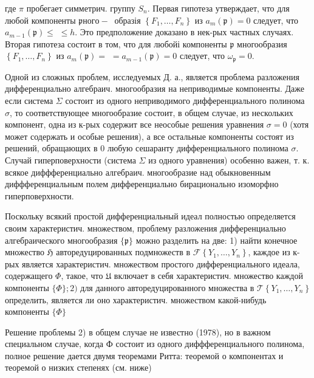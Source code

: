 \documentclass[10pt]{article}
\begin{document}
где $\pi$ пробегает симметрич. группу $S_{n}$. Первая гипотеза утверждает, что для любой компоненты $\mathfrak{p н о г о - ~}$ образія $\left\{F_{1}, \ldots, F_{n}\right\}$ из $a_{m}(\mathfrak{p})=0$ следует, что $a_{m-1}(\mathfrak{p}) \leqslant$ $\leqslant h$. Это предположение доказано в нек-рых частных случаях. Вторая гипотеза состоит в том, что для любойі компоненты $\mathfrak{p}$ многообразия $\left\{F_{1}, \ldots, F_{n}\right\}$ из $a_{m}(\mathfrak{p})=$ $=a_{m-1}(\mathfrak{p})=0$ следует, что $\omega_{\mathfrak{p}}=0$.



Одной из сложных проблем, исследуемых Д. а., является проблема разложения дифференциально алгебраич. многообразия на неприводимые компоненты. Даже если система $\Sigma$ состоит из одного неприводимого дифференциального полинома $\sigma$, то соответствующее многообразие состоит, в общем случае, из нескольких компонент, одна из к-рых содержит все неособые решения уравнения $\sigma=0$ (хотя может содержать и особые решения), а все остальные компоненты состоят из решений, обращающих в 0 любую сешаранту дифференциального полинома $\sigma$. Случай гиперповерхности (система $\Sigma$ из одного уравнения) особенно важен, т. к. всякое диффференциально алгебраич. многообразие над обыкновенным диффференциальным полем дифференциально бирационально изоморфно гиперповерхности.



Поскольку всякий простой дифференциальный идеал полностью определяется своим характеристич. множеством, проблему разложения дифференциально алгебраического многообразия $\{\mathfrak{p}\}$ можно разделить на две: 1) найти конечное множество $\mathfrak{H}$ авторедуцированных подмножеств в $\mathscr{F}\left\{Y_{1}, \ldots, Y_{n}\right\}$, каждое из к-рых является характеристич. множеством простого дифференциального идеала, содержащего $\Phi$, такое, что $\mathfrak{U}$ включает в себя характеристич. множество каждой компоненты $\{\Phi\} ; 2)$ для данного авторедуцированного множества в $\mathscr{T}\left\{Y_{1}, \ldots, Y_{n}\right\}$ определить, является ли оно характеристич. множеством какой-нибудь компоненты $\{\Phi\}$



Решение проблемы 2) в общем случае не известно (1978), но в важном специальном случае, когда Ф состоит из одного диффференциального полинома, полное решение дается двумя теоремами Ритта: теоремой о компонентах и теоремой о низких степенях (см. ниже)
\end{document}
